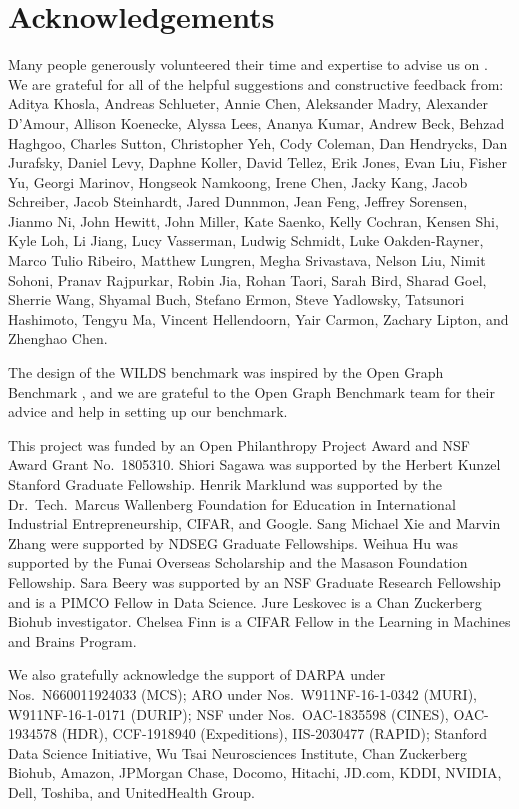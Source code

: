 \section*{Acknowledgements}
Many people generously volunteered their time and expertise to advise us on \Wilds.
We are grateful for all of the helpful suggestions and constructive feedback from:
Aditya Khosla,
Andreas Schlueter,
Annie Chen,
Aleksander Madry,
Alexander D’Amour,
Allison Koenecke,
Alyssa Lees,
Ananya Kumar,
Andrew Beck,
Behzad Haghgoo,
Charles Sutton,
Christopher Yeh,
Cody Coleman,
Dan Hendrycks,
Dan Jurafsky,
Daniel Levy,
Daphne Koller,
David Tellez,
Erik Jones,
Evan Liu,
Fisher Yu,
Georgi Marinov,
Hongseok Namkoong,
Irene Chen,
Jacky Kang,
Jacob Schreiber,
Jacob Steinhardt,
Jared Dunnmon,
Jean Feng,
Jeffrey Sorensen,
Jianmo Ni,
John Hewitt,
John Miller,
Kate Saenko,
Kelly Cochran,
Kensen Shi,
Kyle Loh,
Li Jiang,
Lucy Vasserman,
Ludwig Schmidt,
Luke Oakden-Rayner,
Marco Tulio Ribeiro,
Matthew Lungren,
Megha Srivastava,
Nelson Liu,
Nimit Sohoni,
Pranav Rajpurkar,
Robin Jia,
Rohan Taori,
Sarah Bird,
Sharad Goel,
Sherrie Wang,
Shyamal Buch,
Stefano Ermon,
Steve Yadlowsky,
Tatsunori Hashimoto,
Tengyu Ma,
Vincent Hellendoorn,
Yair Carmon,
Zachary Lipton,
and Zhenghao Chen.

The design of the WILDS benchmark was inspired by the Open Graph Benchmark \citep{hu2020open}, and we are grateful to the Open Graph Benchmark team for their advice and help in setting up our benchmark.

This project was funded by an Open Philanthropy Project Award and NSF Award Grant No.~1805310.
Shiori Sagawa was supported by the Herbert Kunzel Stanford Graduate Fellowship.
Henrik Marklund was supported by the Dr.~Tech.~Marcus Wallenberg Foundation for Education in International Industrial Entrepreneurship, CIFAR, and Google.
Sang Michael Xie and Marvin Zhang were supported by NDSEG Graduate Fellowships.
Weihua Hu was supported by the Funai Overseas Scholarship and the Masason Foundation Fellowship.
Sara Beery was supported by an NSF Graduate Research Fellowship and is a PIMCO Fellow in Data Science.
Jure Leskovec is a Chan Zuckerberg Biohub investigator.
Chelsea Finn is a CIFAR Fellow in the Learning in Machines and Brains Program.

We also gratefully acknowledge the support of DARPA under Nos.~N660011924033 (MCS);
ARO under Nos.~W911NF-16-1-0342 (MURI), W911NF-16-1-0171 (DURIP);
NSF under Nos.~OAC-1835598 (CINES), OAC-1934578 (HDR), CCF-1918940 (Expeditions), IIS-2030477 (RAPID); Stanford Data Science Initiative, Wu Tsai Neurosciences Institute, Chan Zuckerberg Biohub, Amazon, JPMorgan Chase, Docomo, Hitachi, JD.com, KDDI, NVIDIA, Dell, Toshiba, and UnitedHealth Group.

